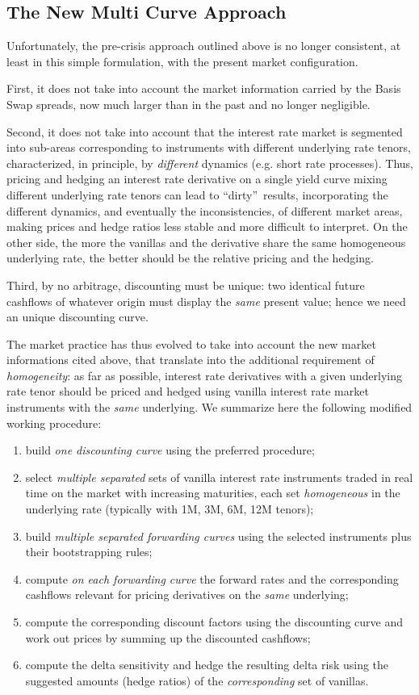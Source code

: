 \documentclass[11pt,reqno]{amsart}
\begin{document}
\subsection{\label{sec:MultiCurve}The New Multi Curve Approach}
\par
Unfortunately, the pre-crisis approach outlined above is no longer consistent, at least in this simple formulation, with the present market configuration.
\par
First, it does not take into account the market information carried by the Basis Swap spreads, now much larger than in the past and no longer negligible.
\par
Second, it does not take into account that the interest rate market is segmented into sub-areas corresponding to instruments with different underlying rate tenors, characterized, in principle, by \emph{different} dynamics (e.g. short rate processes). Thus, pricing and hedging an interest rate derivative on a single yield curve mixing different underlying rate tenors can lead to \textquotedblleft dirty\textquotedblright\ results, incorporating the different dynamics, and eventually the inconsistencies, of different market areas, making prices and hedge ratios less stable and more difficult to interpret. On the other side, the more the vanillas and the derivative share the same homogeneous underlying rate, the better should be the relative pricing and the hedging.
\par
Third, by no arbitrage, discounting must be unique: two identical future cashflows of whatever origin must display the \emph{same} present value; hence we need an unique discounting curve.
\par
The market practice has thus evolved to take into account the new market informations cited above, that translate into the additional requirement of \emph{homogeneity}: as far as possible, interest rate derivatives with a given underlying rate tenor should be priced and hedged using vanilla interest rate market instruments with the \emph{same} underlying. We summarize here the following modified working procedure:
\begin{enumerate}
\item build \emph{one discounting curve} using the preferred procedure;
\item select \emph{multiple separated} sets of vanilla interest rate instruments traded in real time on the market with increasing maturities, each set \emph{homogeneous} in the underlying rate (typically with 1M, 3M, 6M, 12M tenors);
\item build \emph{multiple separated forwarding curves} using the selected instruments plus their bootstrapping rules;
\item compute \emph{on each forwarding curve} the forward rates and the corresponding cashflows relevant for pricing derivatives on the \emph{same} underlying;
\item compute the corresponding discount factors using the discounting curve and work out prices by summing up the discounted cashflows;
\item compute the delta sensitivity and hedge the resulting delta risk using the suggested amounts (hedge ratios) of the \emph{corresponding} set of vanillas.
\end{enumerate}
\end{document}

